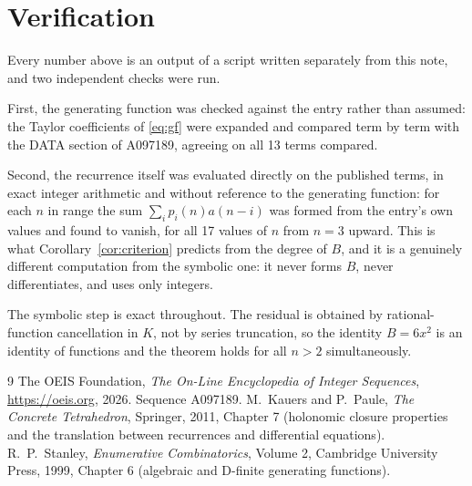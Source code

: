 \documentclass[11pt,a4paper]{article}
\theoremstyle{plain}
\theoremstyle{definition}
\begin{document}
\section{Verification}

Every number above is an output of a script written separately from this note, and two
independent checks were run.

First, the generating function was checked against the entry rather than assumed: the
Taylor coefficients of \eqref{eq:gf} were expanded and compared term by term with the DATA
section of A097189, agreeing on all 13 terms compared.

Second, the recurrence itself was evaluated directly on the published terms, in exact
integer arithmetic and without reference to the generating function: for each $n$ in range
the sum $\sum_{i}p_{i}(n)a(n-i)$ was formed from the entry's own values and found to
vanish, for all 17 values of $n$ from $n=3$ upward. This is what
Corollary~\ref{cor:criterion} predicts from the degree of $B$, and it is a genuinely
different computation from the symbolic one: it never forms $B$, never differentiates, and
uses only integers.

The symbolic step is exact throughout. The residual is obtained by rational-function
cancellation in $K$, not by series truncation, so the identity $B=6 x^{2}$ is an
identity of functions and the theorem holds for all $n>2$ simultaneously.

\begin{thebibliography}{9}
 The OEIS Foundation, \emph{The On-Line Encyclopedia of Integer Sequences},
\url{https://oeis.org}, 2026. Sequence A097189.
 M.~Kauers and P.~Paule, \emph{The Concrete Tetrahedron}, Springer, 2011,
Chapter 7 (holonomic closure properties and the translation between recurrences and
differential equations).
 R.~P.~Stanley, \emph{Enumerative Combinatorics}, Volume 2, Cambridge
University Press, 1999, Chapter 6 (algebraic and D-finite generating functions).
\end{thebibliography}
\end{document}

